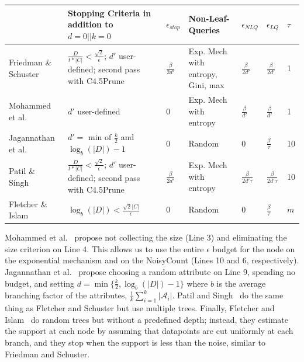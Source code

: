 \documentclass[11pt]{report}
\begin{document}
\begin{center}
\begin{tabular}{|p{2cm}|p{3cm}|l|p{3cm}|l|l|l|}
\hline
\; & Stopping Criteria in addition to $d = 0 || k=0$& $\epsilon_{stop}$ & Non-Leaf-Queries & $\epsilon_{NLQ}$ & $\epsilon_{LQ}$ & $\tau$ \\ \hline
Friedman \& Schuster~\cite{Friedman:2010} & $\frac{D}{t*|C|} < \frac{\sqrt{2}}{\epsilon}$; $d'$ user-defined; second pass with C4.5Prune & $\frac{\beta}{2d'}$ & Exp. Mech with entropy, Gini, max & $\frac{\beta}{2d'}$ & $\frac{\beta}{2d'}$ & 1 \\ \hline
Mohammed et al.~\cite{Mohammed:2015} & $d'$ user-defined & 0 & Exp. Mech with entropy & $\frac{\beta}{d'}$ & $\frac{\beta}{d'}$ & 1 \\ \hline
Jagannathan et al.~\cite{Jagannathan:2009} & $d'=$ min of $\frac{k}{2}$ and $\log_b(|D|)-1$ & 0 & Random & 0 & $\frac{\beta}{\tau}$ & 10 \\ \hline
Patil \& Singh~\cite{Singh:2014} & $\frac{D}{t*|C|} < \frac{\sqrt{2}}{\epsilon}$; $d'$ user-defined; second pass with C4.5Prune & $\frac{\beta}{2d'}$ & Exp. Mech with entropy & $\frac{\beta}{2d'\tau}$ & $\frac{\beta}{2d'\tau}$ & 10 \\ \hline
Fletcher \& Islam~\cite{Fletcher:2015} & $\log_b(|D|) < \frac{\sqrt{2}|C|}{\epsilon}$ & 0 & Random & 0 & $\frac{\beta}{\tau}$ & $m$ \\ \hline
\end{tabular}
\end{center}
Mohammed et al.~\cite{Mohammed:2015} propose not collecting the size (Line 3) and eliminating the size criterion on Line 4. This allows us to use the entire $\epsilon$ budget for the node on the exponential mechanism and on the NoisyCount (Lines 10 and 6, respectively). Jagannathan et al.~\cite{Jagannathan:2009} propose choosing a random attribute on Line 9, spending no budget, and setting $d = \min\{\frac{k}{2}, \log_b(|D|)-1\}$ where $b$ is the average branching factor of the attributes, $\frac{1}{k}\sum_{i=1}^k |\mathcal{A}_i|$. Patil and Singh~\cite{Singh:2014} do the same thing as Fletcher and Schuster but use multiple trees. Finally, Fletcher and Islam~\cite{Fletcher:2015} do random trees but without a predefined depth; instead, they estimate the support at each node by assuming that datapoints are cut uniformly at each branch, and they stop when the support is less than the noise, similar to Friedman and Schuster.
\end{document}
